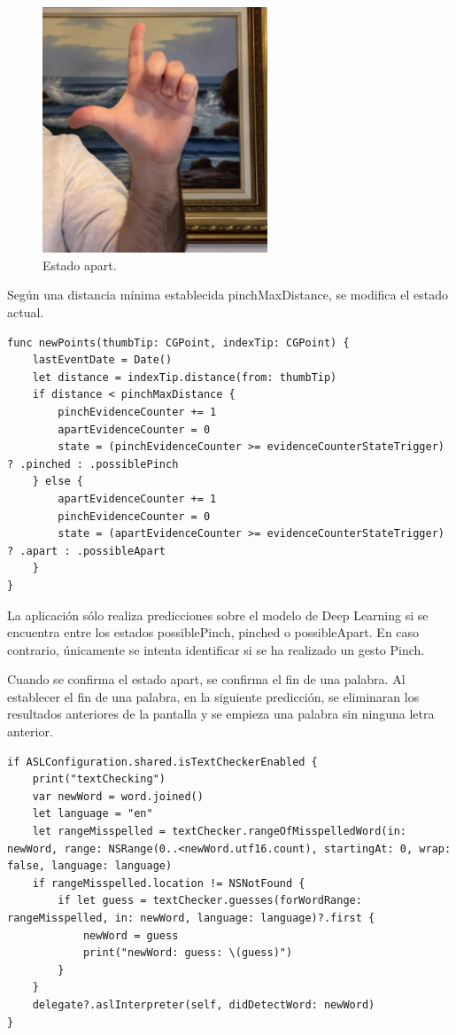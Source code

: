 \documentclass[../main.tex]{subfiles}
\begin{document}
\begin{figure}[h]
\centering 
\includegraphics[width=0.6\textwidth]{images/interpreter/apart.png}
\caption{Estado apart.}
\label{figure27}
\end{figure}


Según una distancia mínima establecida pinchMaxDistance, se modifica el estado actual. 
\begin{lstlisting}[style=swift]
func newPoints(thumbTip: CGPoint, indexTip: CGPoint) {
    lastEventDate = Date()
    let distance = indexTip.distance(from: thumbTip)
    if distance < pinchMaxDistance {
        pinchEvidenceCounter += 1
        apartEvidenceCounter = 0
        state = (pinchEvidenceCounter >= evidenceCounterStateTrigger) ? .pinched : .possiblePinch
    } else {
        apartEvidenceCounter += 1
        pinchEvidenceCounter = 0
        state = (apartEvidenceCounter >= evidenceCounterStateTrigger) ? .apart : .possibleApart
    }
}
\end{lstlisting}

La aplicación sólo realiza predicciones sobre el modelo de Deep Learning si se encuentra entre los estados possiblePinch, pinched o possibleApart. En caso contrario, únicamente se intenta identificar si se ha realizado un gesto Pinch.

Cuando se confirma el estado apart, se confirma el fin de una palabra. Al establecer el fin de una palabra, en la siguiente predicción, se eliminaran los resultados anteriores de la pantalla y se empieza una palabra sin ninguna  letra anterior.


\begin{lstlisting}[style=swift]
if ASLConfiguration.shared.isTextCheckerEnabled {
    print("textChecking")
    var newWord = word.joined()
    let language = "en"
    let rangeMisspelled = textChecker.rangeOfMisspelledWord(in: newWord, range: NSRange(0..<newWord.utf16.count), startingAt: 0, wrap: false, language: language)
    if rangeMisspelled.location != NSNotFound {
        if let guess = textChecker.guesses(forWordRange: rangeMisspelled, in: newWord, language: language)?.first {
            newWord = guess
            print("newWord: guess: \(guess)")
        }
    }
    delegate?.aslInterpreter(self, didDetectWord: newWord)
}
\end{lstlisting}
\end{document}

